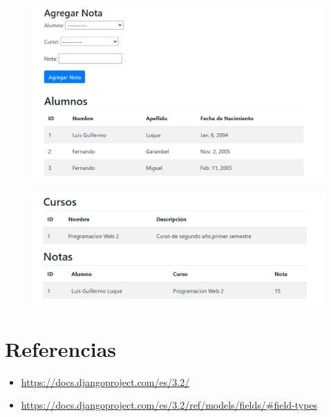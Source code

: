 \documentclass{article}
\begin{document}
	\begin{figure}[H]
		\centering
		\includegraphics[width=1.0\textwidth,keepaspectratio]{img/Vista2.png}
	\end{figure}
	\begin{figure}[H]
		\centering
		\includegraphics[width=1.0\textwidth,keepaspectratio]{img/Vista3.png}
	\end{figure}
\section{Referencias}
\begin{itemize}			
	\item \url{https://docs.djangoproject.com/es/3.2/}
	\item\url{https://docs.djangoproject.com/es/3.2/ref/models/fields/#field-types}
\end{itemize}	
	
%
%
%
			
\end{document}
